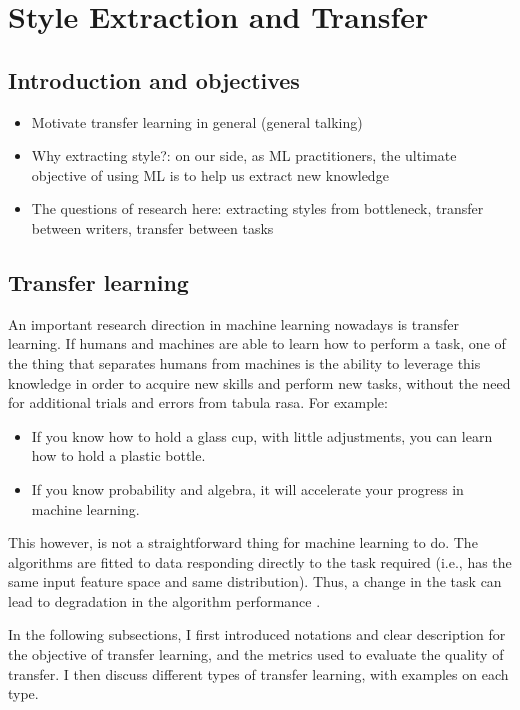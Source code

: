 \chapter{Style Extraction and Transfer}
\section{Introduction and objectives}
\begin{itemize}[noitemsep]
    \item Motivate transfer learning in general (general talking)
    \item Why extracting style?: on our side, as ML practitioners, the ultimate objective of using ML is to help us extract new knowledge
    \item The questions of research here: extracting styles from bottleneck, transfer between writers, transfer between tasks
\end{itemize}

\section{Transfer learning}\label{sec:transfer_learning}
\par An important research direction in machine learning nowadays is transfer learning. If humans and machines are able to learn how to perform a task, one of the thing that separates humans from machines is the ability to leverage this knowledge in order to acquire new skills and perform new tasks, without the need for additional trials and errors from tabula rasa. For example:
\begin{itemize}[noitemsep]
    \item If you know how to hold a glass cup, with little adjustments, you can learn how to hold a plastic bottle.
    \item If you know probability and algebra, it will accelerate your progress in machine learning.
\end{itemize}
This however, is not a straightforward thing for machine learning to do. The algorithms are fitted to data responding directly to the task required (i.e., has the same input feature space and same distribution). Thus, a change in the task can lead to degradation in the algorithm performance \citep{shimodaira2000improving,weiss2016survey}.

\par In the following subsections, I first introduced notations and clear description for the objective of transfer learning, and the metrics used to evaluate the quality of transfer. I then discuss different types of transfer learning, with examples on each type.

